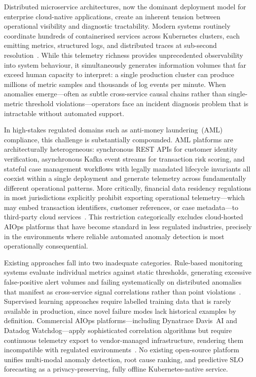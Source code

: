 \documentclass[a4paper,anonymous,UKenglish]{lipics-v2021}
\begin{document}
Distributed microservice architectures, now the dominant deployment model for
enterprise cloud-native applications, create an inherent tension between
operational visibility and diagnostic tractability. Modern systems routinely
coordinate hundreds of containerised services across Kubernetes clusters, each
emitting metrics, structured logs, and distributed traces at sub-second
resolution~\cite{burns2016borg}. While this telemetry richness provides
unprecedented observability into system behaviour, it simultaneously generates
information volumes that far exceed human capacity to interpret: a single
production cluster can produce millions of metric samples and thousands of log
events per minute. When anomalies emerge---often as subtle cross-service causal
chains rather than single-metric threshold violations---operators face an
incident diagnosis problem that is intractable without automated support.

In high-stakes regulated domains such as anti-money laundering~(AML)
compliance, this challenge is substantially compounded. AML platforms are
architecturally heterogeneous: synchronous REST APIs for customer identity
verification, asynchronous Kafka event streams for transaction risk scoring,
and stateful case management workflows with legally mandated lifecycle
invariants all coexist within a single deployment and generate telemetry across
fundamentally different operational patterns. More critically, financial data
residency regulations in most jurisdictions explicitly prohibit exporting
operational telemetry---which may embed transaction identifiers, customer
references, or case metadata---to third-party cloud
services~\cite{kosinska2023toward}. This restriction categorically excludes
cloud-hosted AIOps platforms that have become standard in less regulated
industries, precisely in the environments where reliable automated anomaly
detection is most operationally consequential.

Existing approaches fall into two inadequate categories. Rule-based monitoring
systems evaluate individual metrics against static thresholds, generating
excessive false-positive alert volumes and failing systematically on distributed
anomalies that manifest as cross-service signal correlations rather than point
violations~\cite{soldani2022anomaly}. Supervised learning approaches require
labelled training data that is rarely available in production, since novel
failure modes lack historical examples by definition. Commercial AIOps
platforms---including Dynatrace Davis~AI and Datadog Watchdog---apply
sophisticated correlation algorithms but require continuous telemetry export to
vendor-managed infrastructure, rendering them incompatible with regulated
environments~\cite{dynatrace2023, datadog2023}. No existing open-source
platform unifies multi-modal anomaly detection, root cause ranking, and
predictive SLO forecasting as a privacy-preserving, fully offline
Kubernetes-native service.
\end{document}
